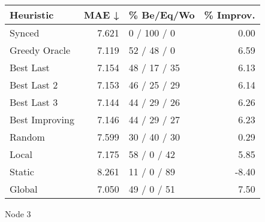 \begin{tabular}{lrlr}
\toprule
\textbf{Heuristic} & \textbf{MAE ↓} & \textbf{\% Be/Eq/Wo} & \textbf{\% Improv.} \\
\midrule
            Synced &          7.621 &          0 / 100 / 0 &                0.00 \\
     Greedy Oracle &          7.119 &          52 / 48 / 0 &                6.59 \\
         Best Last &          7.154 &         48 / 17 / 35 &                6.13 \\
       Best Last 2 &          7.153 &         46 / 25 / 29 &                6.14 \\
       Best Last 3 &          7.144 &         44 / 29 / 26 &                6.26 \\
    Best Improving &          7.146 &         44 / 29 / 27 &                6.23 \\
            Random &          7.599 &         30 / 40 / 30 &                0.29 \\
             Local &          7.175 &          58 / 0 / 42 &                5.85 \\
            Static &          8.261 &          11 / 0 / 89 &               -8.40 \\
            Global &          7.050 &          49 / 0 / 51 &                7.50 \\
\bottomrule
\end{tabular}
\caption{Node 3}
\label{tab:ds_non_lr05_le1_bs4_3}
